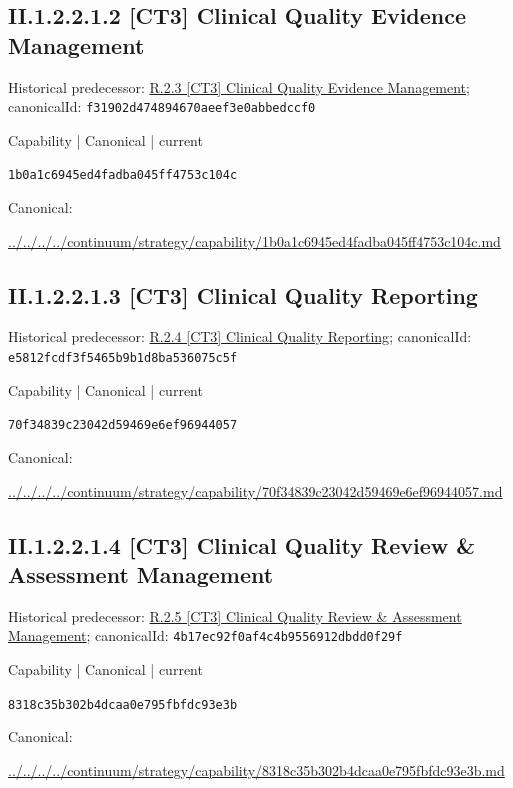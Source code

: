 \documentclass[10pt,a4paper]{article}
\begin{document}
\subsection*{II.1.2.2.1.2 [CT3] Clinical Quality Evidence Management}
Historical predecessor: \hyperref[element-f31902d474894670aeef3e0abbedccf0]{R.2.3 [CT3] Clinical Quality Evidence Management}; canonicalId: \texttt{f31902d474894670aeef3e0abbedccf0}\par
\label{element-1b0a1c6945ed4fadba045ff4753c104c}
{\small Capability | Canonical | current}\par
\texttt{1b0a1c6945ed4fadba045ff4753c104c}\par
Canonical: \par
{\footnotesize\url{../../../../continuum/strategy/capability/1b0a1c6945ed4fadba045ff4753c104c.md}}\par
\subsection*{II.1.2.2.1.3 [CT3] Clinical Quality Reporting}
Historical predecessor: \hyperref[element-e5812fcdf3f5465b9b1d8ba536075c5f]{R.2.4 [CT3] Clinical Quality Reporting}; canonicalId: \texttt{e5812fcdf3f5465b9b1d8ba536075c5f}\par
\label{element-70f34839c23042d59469e6ef96944057}
{\small Capability | Canonical | current}\par
\texttt{70f34839c23042d59469e6ef96944057}\par
Canonical: \par
{\footnotesize\url{../../../../continuum/strategy/capability/70f34839c23042d59469e6ef96944057.md}}\par
\subsection*{II.1.2.2.1.4 [CT3] Clinical Quality Review \& Assessment Management}
Historical predecessor: \hyperref[element-4b17ec92f0af4c4b9556912dbdd0f29f]{R.2.5 [CT3] Clinical Quality Review \& Assessment Management}; canonicalId: \texttt{4b17ec92f0af4c4b9556912dbdd0f29f}\par
\label{element-8318c35b302b4dcaa0e795fbfdc93e3b}
{\small Capability | Canonical | current}\par
\texttt{8318c35b302b4dcaa0e795fbfdc93e3b}\par
Canonical: \par
{\footnotesize\url{../../../../continuum/strategy/capability/8318c35b302b4dcaa0e795fbfdc93e3b.md}}\par
\end{document}
